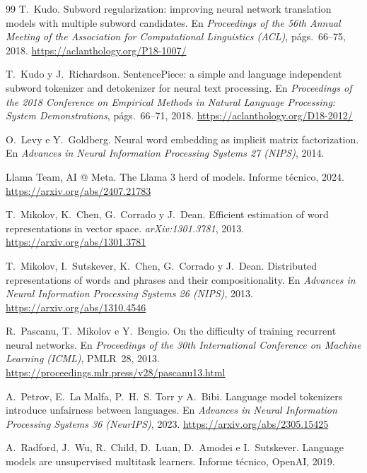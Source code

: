 \begin{thebibliography}{99}
T.~Kudo.
\newblock Subword regularization: improving neural network translation models with multiple subword candidates.
\newblock En \emph{Proceedings of the 56th Annual Meeting of the Association for Computational Linguistics (ACL)}, págs.~66--75, 2018.
\newblock \url{https://aclanthology.org/P18-1007/}

T.~Kudo y J.~Richardson.
\newblock SentencePiece: a simple and language independent subword tokenizer and detokenizer for neural text processing.
\newblock En \emph{Proceedings of the 2018 Conference on Empirical Methods in Natural Language Processing: System Demonstrations}, págs.~66--71, 2018.
\newblock \url{https://aclanthology.org/D18-2012/}

O.~Levy e Y.~Goldberg.
\newblock Neural word embedding as implicit matrix factorization.
\newblock En \emph{Advances in Neural Information Processing Systems 27 (NIPS)}, 2014.

Llama Team, AI @ Meta.
\newblock The Llama 3 herd of models.
\newblock Informe técnico, 2024.
\newblock \url{https://arxiv.org/abs/2407.21783}

T.~Mikolov, K.~Chen, G.~Corrado y J.~Dean.
\newblock Efficient estimation of word representations in vector space.
\newblock \emph{arXiv:1301.3781}, 2013.
\newblock \url{https://arxiv.org/abs/1301.3781}

T.~Mikolov, I.~Sutskever, K.~Chen, G.~Corrado y J.~Dean.
\newblock Distributed representations of words and phrases and their compositionality.
\newblock En \emph{Advances in Neural Information Processing Systems 26 (NIPS)}, 2013.
\newblock \url{https://arxiv.org/abs/1310.4546}

R.~Pascanu, T.~Mikolov e Y.~Bengio.
\newblock On the difficulty of training recurrent neural networks.
\newblock En \emph{Proceedings of the 30th International Conference on Machine Learning (ICML)}, PMLR~28, 2013.
\newblock \url{https://proceedings.mlr.press/v28/pascanu13.html}

A.~Petrov, E.~La Malfa, P.~H.~S. Torr y A.~Bibi.
\newblock Language model tokenizers introduce unfairness between languages.
\newblock En \emph{Advances in Neural Information Processing Systems 36 (NeurIPS)}, 2023.
\newblock \url{https://arxiv.org/abs/2305.15425}

A.~Radford, J.~Wu, R.~Child, D.~Luan, D.~Amodei e I.~Sutskever.
\newblock Language models are unsupervised multitask learners.
\newblock Informe técnico, OpenAI, 2019.


\end{thebibliography}
